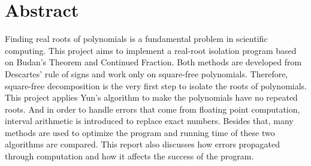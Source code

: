 \section{Abstract}

Finding real roots of polynomials is a fundamental problem in scientific
computing. This project aims to implement a real-root isolation program based on
Budan’s Theorem and Continued Fraction. Both methods are developed from
Descartes’ rule of signs and work only on square-free polynomials. Therefore,
square-free decomposition is the very first step to isolate the roots of
polynomials. This project applies Yun’s algorithm to make the polynomials have
no repeated roots. And in order to handle errors that come from floating point
computation, interval arithmetic is introduced to replace exact numbers. Besides
that, many methods are used to optimize the program and running time of these
two algorithms are compared. This report also discusses how errors propagated
through computation and how it affects the success of the program.
